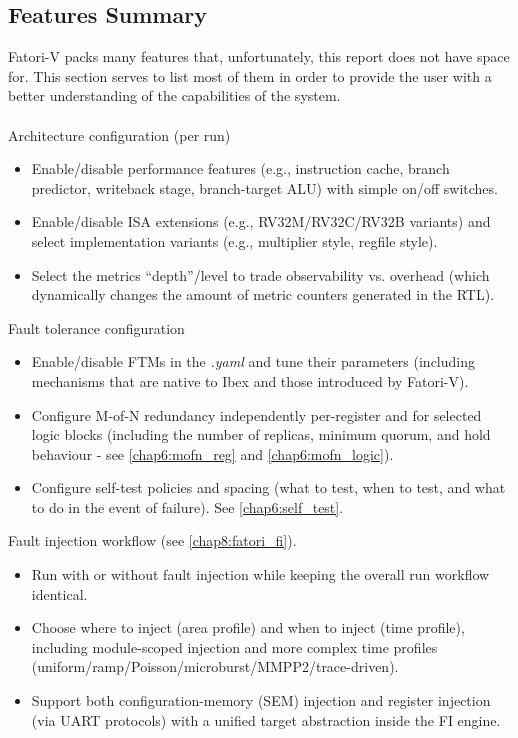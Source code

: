 \subsection{Features Summary}
\label{chap3:features}

 \ac{Fatori-V} packs many features that, unfortunately, this report does not have space for. This section serves to list most of them in order to provide the user with a better understanding of the capabilities of the system.\\\\
Architecture configuration (per run)
\begin{itemize}
    \item Enable/disable performance features (e.g., instruction cache, branch predictor, writeback stage, branch-target ALU) with simple on/off switches.
    \item Enable/disable ISA extensions (e.g., RV32M/RV32C/RV32B variants) and select implementation variants (e.g., multiplier style, regfile style).
    \item Select the metrics “depth”/level to trade observability vs. overhead (which dynamically changes the amount of metric counters generated in the \ac{RTL}).
\end{itemize}

 Fault tolerance configuration
\begin{itemize}
    \item Enable/disable \acp{FTM} in the \textit{.yaml} and tune their parameters (including mechanisms that are native to Ibex and those introduced by Fatori-V).
    \item Configure M-of-N redundancy independently per-register and for selected logic blocks (including the number of replicas, minimum quorum, and hold behaviour - see \cref{chap6:mofn_reg} and \cref{chap6:mofn_logic}).
    \item Configure self-test policies and spacing (what to test, when to test, and what to do in the event of failure). See \cref{chap6:self_test}.
\end{itemize}

 Fault injection workflow (see \cref{chap8:fatori_fi}).
\begin{itemize}
    \item Run with or without fault injection while keeping the overall run workflow identical.
    \item Choose where to inject (area profile) and when to inject (time profile), including module-scoped injection and more complex time profiles (uniform/ramp/Poisson/microburst/MMPP2/trace-driven).
    \item Support both configuration-memory (SEM) injection and register injection (via UART protocols) with a unified target abstraction inside the FI engine.
\end{itemize}

